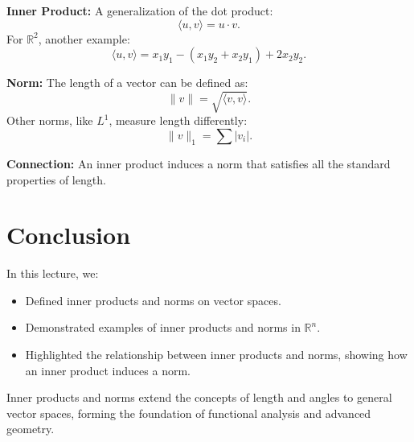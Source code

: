 \documentclass{article}
\begin{document}
\textbf{Inner Product:}
A generalization of the dot product:
\[
  \langle u, v \rangle = u \cdot v.
\]
For $\mathbb{R}^2$, another example:
\[
  \langle u, v \rangle = x_1 y_1 - (x_1 y_2 + x_2 y_1) + 2x_2 y_2.
\]

\textbf{Norm:}
The length of a vector can be defined as:
\[
  \|v\| = \sqrt{\langle v, v \rangle}.
\]
Other norms, like $L^1$, measure length differently:
\[
  \|v\|_1 = \sum |v_i|.
\]

\textbf{Connection:}
An inner product induces a norm that satisfies all the standard properties of length.

\section*{Conclusion}

In this lecture, we:
\begin{itemize}
  \item Defined inner products and norms on vector spaces.
  \item Demonstrated examples of inner products and norms in $\mathbb{R}^n$.
  \item Highlighted the relationship between inner products and norms, showing how an inner product induces a norm.
\end{itemize}

Inner products and norms extend the concepts of length and angles to general vector spaces, forming the foundation of functional analysis and advanced geometry.
\end{document}
